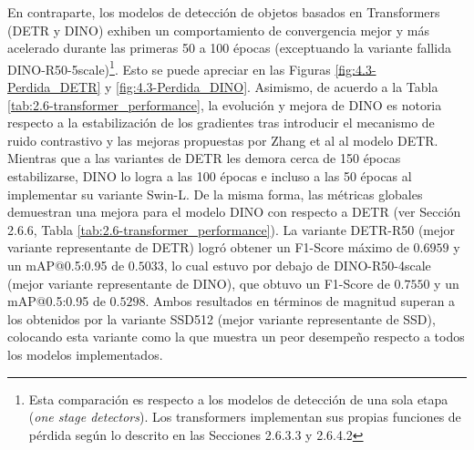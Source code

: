En contraparte, los modelos de detección de objetos basados en Transformers (DETR y DINO) exhiben un comportamiento de convergencia mejor y más acelerado durante las primeras 50 a 100 épocas (exceptuando la variante fallida DINO-R50-5scale)\footnote{Esta comparación es respecto a los modelos de detección de una sola etapa (\textit{one stage detectors}). Los transformers implementan sus propias funciones de pérdida según lo descrito en las Secciones 2.6.3.3 y 2.6.4.2}. Esto se puede apreciar en las Figuras \ref{fig:4.3-Perdida_DETR} y \ref{fig:4.3-Perdida_DINO}. Asimismo, de acuerdo a la Tabla \ref{tab:2.6-transformer_performance}, la evolución y mejora de DINO es notoria respecto a la estabilización de los gradientes tras introducir el mecanismo de ruido contrastivo y las mejoras propuestas por Zhang et al \cite{zhang2022dino} al modelo DETR. Mientras que a las variantes de DETR les demora cerca de 150 épocas estabilizarse, DINO lo logra a las 100 épocas e incluso a las 50 épocas al implementar su variante Swin-L. De la misma forma, las métricas globales demuestran una mejora para el modelo DINO con respecto a DETR (ver Sección 2.6.6, Tabla \ref{tab:2.6-transformer_performance}). La variante DETR-R50 (mejor variante representante de DETR) logró obtener un F1-Score máximo de $0.6959$ y un mAP@0.5:0.95 de $0.5033$, lo cual estuvo por debajo de DINO-R50-4scale (mejor variante representante de DINO), que obtuvo un F1-Score de $0.7550$ y un mAP@0.5:0.95 de $0.5298$. Ambos resultados en términos de magnitud superan a los obtenidos por la variante SSD512 (mejor variante representante de SSD), colocando esta variante como la que muestra un peor desempeño respecto a todos los modelos implementados. \\


